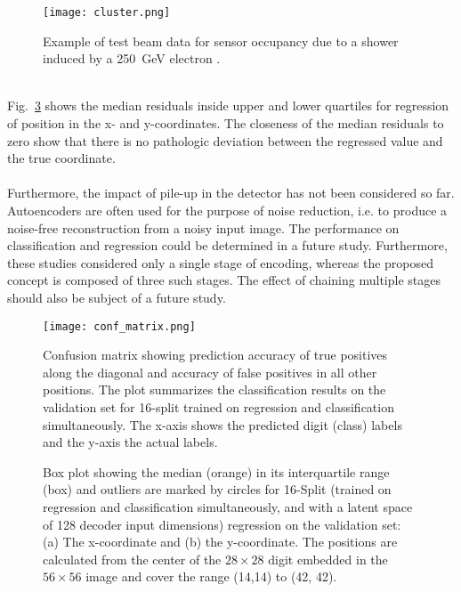 \documentclass[../../main.tex]{subfiles}
\begin{document}
\begin{figure}[htp]
			\begin{center}
				\texttt{[image: cluster.png]}
				\caption{Example of test beam data for sensor occupancy due to a shower induced by a \SI{250}{GeV} electron \cite{Steen2017}.}
				\label{fig:shower_expl}
			\end{center}
\end{figure}
\\
Fig.~\ref{fig:residuals} shows the median residuals inside upper and lower quartiles for regression of position in the x- and y-coordinates. The closeness of the median residuals to zero show that there is no pathologic deviation between the regressed value and the true coordinate.\\
\\
Furthermore, the impact of pile-up in the detector has not been considered so far. Autoencoders are often used for the purpose of noise reduction, i.e. to produce a noise-free reconstruction from a noisy input image. The performance on classification and regression could be determined in a future study. Furthermore, these studies considered only a single stage of encoding, whereas the proposed concept is composed of three such stages. The effect of chaining multiple stages should also be subject of a future study.
\begin{figure}[htp]
			\begin{center}
				\texttt{[image: conf\_matrix.png]}
				\caption{Confusion matrix showing prediction accuracy of true positives along the diagonal and accuracy of false positives in all other positions. The plot summarizes the classification results on the validation set for 16-split trained on regression and classification simultaneously. The x-axis shows the predicted digit (class) labels and the y-axis the actual labels.}
				\label{fig:classif_distrib}
			\end{center}
\end{figure}
\begin{figure}[htp]
			\begin{center}
				\hspace{1mm}
				\caption{Box plot showing the median (orange) in its interquartile range (box) and outliers are marked by circles for 16-Split (trained on regression and classification simultaneously, and with a latent space of 128 decoder input dimensions) regression on the validation set: (a) The x-coordinate and (b) the y-coordinate. The positions are calculated from the center of the $28\times28$ digit embedded in the $56\times56$ image and cover the range (14,14) to (42, 42).}
				\label{fig:residuals}
			\end{center}
\end{figure}
\end{document}

